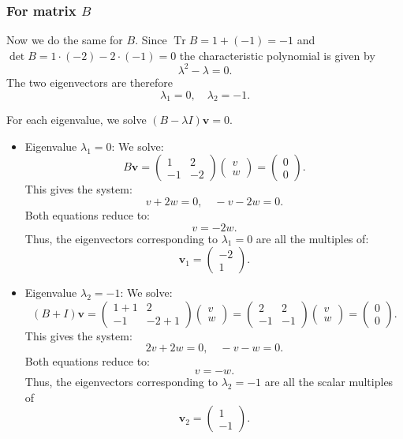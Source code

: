 \documentclass[addpoints, 12pt,answers]{exam}
\begin{document}
\begin{questions}
\begin{solution}
\subsubsection*{For matrix $B$}
Now we do the same for $B$.
Since $\operatorname{Tr} B = 1 + (-1) = -1$ and $\det B = 1 \cdot (-2) - 2 \cdot (-1) = 0$
the characteristic polynomial is given by
\[ \lambda^2 - \lambda = 0. \]
The two eigenvectors are therefore
\[ \lambda_1 = 0, \quad \lambda_2 = -1. \]

For each eigenvalue, we solve $(B - \lambda I)\mathbf{v} = 0$.
\begin{itemize}
\item {Eigenvalue $\lambda_1 = 0$:}
We solve:
\[ B \mathbf{v} = \begin{pmatrix} 1 & 2 \\ -1 & -2 \end{pmatrix} \begin{pmatrix} v \\ w \end{pmatrix} = \begin{pmatrix} 0 \\ 0 \end{pmatrix}. \]
This gives the system:
\[ v + 2w = 0, \quad -v - 2w = 0. \]
Both equations reduce to:
\[ v = -2w. \]
Thus, the eigenvectors corresponding to $\lambda_1 = 0$ are all the multiples of:
\[ \mathbf{v}_1 = \begin{pmatrix} -2 \\ 1 \end{pmatrix}. \]

\item {Eigenvalue $\lambda_2 = -1$:}
We solve:
\[ (B + I) \mathbf{v} = \begin{pmatrix} 1 + 1 & 2 \\ -1 & -2 + 1 \end{pmatrix} \begin{pmatrix} v \\ w \end{pmatrix} = \begin{pmatrix} 2 & 2 \\ -1 & -1 \end{pmatrix} \begin{pmatrix} v \\ w \end{pmatrix} = \begin{pmatrix} 0 \\ 0 \end{pmatrix}. \]
This gives the system:
\[ 2v + 2w = 0, \quad -v - w = 0. \]
Both equations reduce to:
\[ v = -w. \]
Thus, the eigenvectors corresponding to $\lambda_2 = -1$ are all the scalar multiples of
\[ \mathbf{v}_2 = \begin{pmatrix} 1 \\ -1 \end{pmatrix}. \]
\end{itemize}
\end{solution}


\end{questions}
\end{document}
